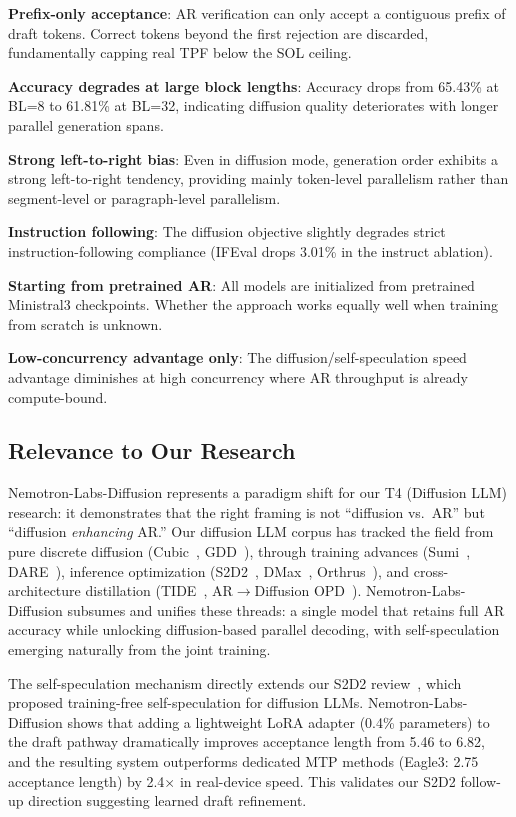 \documentclass[11pt,a4paper]{article}
\begin{document}
\textbf{Prefix-only acceptance}: AR verification can only accept a contiguous prefix of draft tokens. Correct tokens beyond the first rejection are discarded, fundamentally capping real TPF below the SOL ceiling.

\textbf{Accuracy degrades at large block lengths}: Accuracy drops from 65.43\% at BL=8 to 61.81\% at BL=32, indicating diffusion quality deteriorates with longer parallel generation spans.

\textbf{Strong left-to-right bias}: Even in diffusion mode, generation order exhibits a strong left-to-right tendency, providing mainly token-level parallelism rather than segment-level or paragraph-level parallelism.

\textbf{Instruction following}: The diffusion objective slightly degrades strict instruction-following compliance (IFEval drops 3.01\% in the instruct ablation).

\textbf{Starting from pretrained AR}: All models are initialized from pretrained Ministral3 checkpoints. Whether the approach works equally well when training from scratch is unknown.

\textbf{Low-concurrency advantage only}: The diffusion/self-speculation speed advantage diminishes at high concurrency where AR throughput is already compute-bound.

\subsection{Relevance to Our Research}

Nemotron-Labs-Diffusion represents a paradigm shift for our T4 (Diffusion LLM) research: it demonstrates that the right framing is not ``diffusion vs.\ AR'' but ``diffusion \emph{enhancing} AR.'' Our diffusion LLM corpus has tracked the field from pure discrete diffusion (Cubic~\cite{cubic2026}, GDD~\cite{gdd2026}), through training advances (Sumi~\cite{sumi2026}, DARE~\cite{dare2026}), inference optimization (S2D2~\cite{s2d2_2026}, DMax~\cite{dmax2026}, Orthrus~\cite{orthrus2026}), and cross-architecture distillation (TIDE~\cite{tide2026}, AR$\to$Diffusion OPD~\cite{ar2diff2026}). Nemotron-Labs-Diffusion subsumes and unifies these threads: a single model that retains full AR accuracy while unlocking diffusion-based parallel decoding, with self-speculation emerging naturally from the joint training.

The self-speculation mechanism directly extends our S2D2 review~\cite{s2d2_2026}, which proposed training-free self-speculation for diffusion LLMs. Nemotron-Labs-Diffusion shows that adding a lightweight LoRA adapter (0.4\% parameters) to the draft pathway dramatically improves acceptance length from 5.46 to 6.82, and the resulting system outperforms dedicated MTP methods (Eagle3: 2.75 acceptance length) by 2.4$\times$ in real-device speed. This validates our S2D2 follow-up direction suggesting learned draft refinement.
\end{document}
